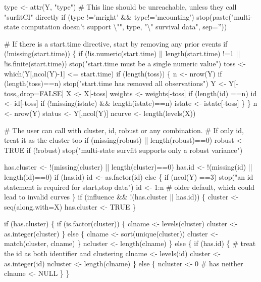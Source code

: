 \documentclass{article}
\begin{document}
\begin{nwchunk}
     type <- attr(Y, "type")
     # This line should be unreachable, unless they call "surfitCI" directly
     if (type !='mright' && type!='mcounting')
          stop(paste("multi-state computation doesn't support {\textbackslash}"", type,
                           "{\textbackslash}" survival data", sep=''))
     
     # If there is a start.time directive, start by removing any prior events
     if (!missing(start.time)) \{
         if (!is.numeric(start.time) || length(start.time) !=1
             || !is.finite(start.time))
             stop("start.time must be a single numeric value")
         toss <- which(Y[,ncol(Y)-1] <= start.time)
         if (length(toss)) \{
             n <- nrow(Y)
             if (length(toss)==n) stop("start.time has removed all observations")
             Y <- Y[-toss,,drop=FALSE]
             X <- X[-toss]
             weights <- weights[-toss]
             if (length(id) ==n) id <- id[-toss]
             if (!missing(istate) && length(istate)==n) istate <- istate[-toss]
             \}
     \}
     n <- nrow(Y)
     status <- Y[,ncol(Y)]
     ncurve <- length(levels(X))
     
     # The user can call with cluster, id, robust or any combination.
     # If only id, treat it as the cluster too
     if (missing(robust) || length(robust)==0) robust <- TRUE
     if (!robust) stop("multi-state survfit supports only a robust variance")
 
     has.cluster <-  !(missing(cluster) || length(cluster)==0) 
     has.id <-       !(missing(id) || length(id)==0)
     if (has.id) id <- as.factor(id)
     else  \{
         if (ncol(Y) ==3) stop("an id statement is required for start,stop data")
         id <- 1:n  # older default, which could lead to invalid curves
     \}
     if (influence && !(has.cluster || has.id)) \{
         cluster <- seq(along.with=X)
         has.cluster <- TRUE
     \}
 
     if (has.cluster) \{
         if (is.factor(cluster)) \{
             clname <- levels(cluster)
             cluster <- as.integer(cluster)
         \} else \{
             clname  <- sort(unique(cluster))
             cluster <- match(cluster, clname)
         \}
         ncluster <- length(clname)
     \} else \{
         if (has.id) \{
             # treat the id as both identifier and clustering
             clname <- levels(id)
             cluster <- as.integer(id)
             ncluster <- length(clname)
         \}
         else \{
             ncluster <- 0  # has neither
             clname <- NULL
         \}
     \}
 

\end{nwchunk}
\end{document}
